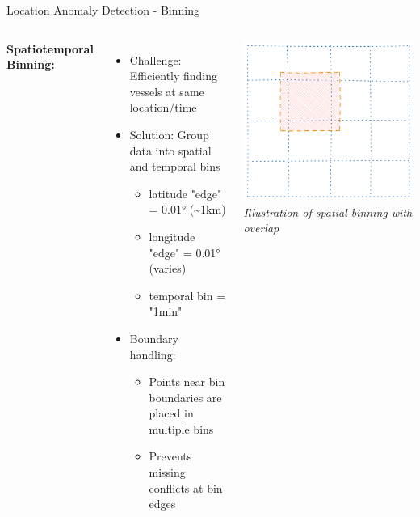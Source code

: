 \documentclass[svgnames, 12pt]{beamer}
\begin{document}
\begin{frame}{Location Anomaly Detection - Binning}
    \begin{columns}
    \textbf{Spatiotemporal Binning:}
    \begin{itemize}
        \item Challenge: Efficiently finding vessels at same location/time
        \item Solution: Group data into spatial and temporal bins
        \begin{itemize}
            \item latitude "edge" = 0.01° (\textasciitilde1km)
            \item longitude "edge" = 0.01° (varies)
            \item temporal bin = "1min"
        \end{itemize}
        \item Boundary handling:
        \begin{itemize}
            \item Points near bin boundaries are placed in multiple bins
            \item Prevents missing conflicts at bin edges
        \end{itemize}
    \end{itemize}
    
    \includegraphics[width=\textwidth]{images/spatial_binning.png}
    {\tiny \textit{Illustration of spatial binning with overlap}}
    \end{columns}
\end{frame}
\end{document}
